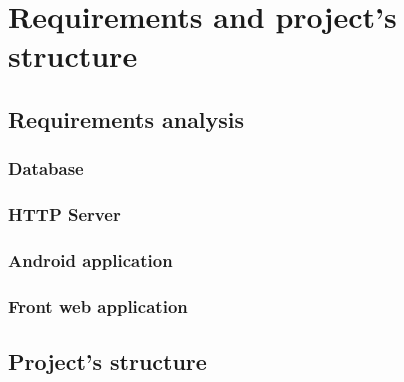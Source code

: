 %
%

\chapter{Requirements and project's structure}

\section{Requirements analysis}

\subsection{Database}

\subsection{HTTP Server}

\subsection{Android application}

\subsection{Front web application}

\section{Project's structure}